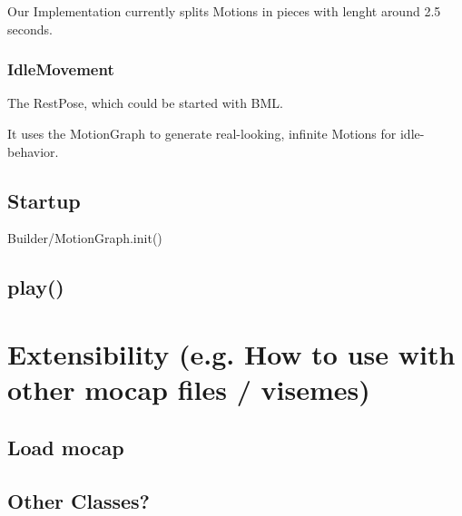 \documentclass[a4paper,10pt]{scrartcl}
\let\stdsubsection\subsection
\renewcommand\subsection{\nopagebreak\stdsubsection}
\begin{document}
Our Implementation currently splits Motions in pieces with lenght around 2.5 seconds.

\subsubsection{IdleMovement}

The RestPose, which could be started with BML.

It uses the MotionGraph to generate real-looking, infinite Motions for idle-behavior.

\subsection{Startup}
Builder/MotionGraph.init()

\subsection{play()}

\section{Extensibility (e.g. How to use with other mocap files / visemes)}

\subsection{Load mocap}

\subsection{Other Classes?}

%
\end{document}
